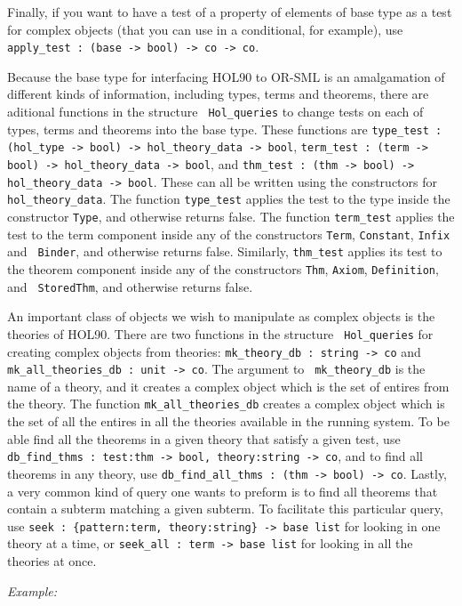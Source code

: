 Finally, if you want to have a test of a property of elements of
base type as a test for complex objects (that you can use in a
conditional, for example), use {\tt apply\_test : (base -> bool) -> co
-> co}.

Because the base type for interfacing HOL90 to OR-SML is an
amalgamation of different kinds of information, including types, terms
and theorems, there are aditional functions in the structure {\tt
Hol\_queries} to change tests on each of types, terms and theorems into
the base type.  These functions are
{\tt type\_test : (hol\_type -> bool) -> hol\_theory\_data -> bool},
{\tt term\_test : (term -> bool) -> hol\_theory\_data -> bool}, and
{\tt thm\_test : (thm -> bool) -> hol\_theory\_data -> bool}.  These
can all be written using the constructors for {\tt hol\_theory\_data}.
The function {\tt type\_test} applies the test to the type inside the
constructor {\tt Type}, and otherwise returns false.  The function
{\tt term\_test} applies the test to the term component inside any of
the constructors {\tt Term}, {\tt Constant}, {\tt Infix} and {\tt
Binder}, and otherwise returns false.  Similarly, {\tt thm\_test}
applies its test to the theorem component inside any of the
constructors {\tt Thm}, {\tt Axiom}, {\tt Definition}, and {\tt
StoredThm}, and otherwise returns false.

An important class of objects we wish to manipulate as complex objects is
the theories of HOL90.  There are two functions in the structure {\tt
Hol\_queries} for creating complex objects from theories:
{\tt mk\_theory\_db : string -> co} and
{\tt mk\_all\_theories\_db : unit -> co}.  The argument to {\tt
mk\_theory\_db} is the name of a theory, and it creates a complex
object which is the set of entires from the theory.  The
function {\tt mk\_all\_theories\_db} creates a complex object
which is the set of all the entires in all the theories available in
the running system.  To be able find all the theorems in a given theory
that satisfy a given test, use {\tt db\_find\_thms : {test:thm ->
bool, theory:string} -> co}, and to find all theorems in any theory,
use {\tt db\_find\_all\_thms : (thm -> bool) -> co}.  Lastly, a very
common kind of query one wants to preform is to find all theorems that
contain a subterm matching a given subterm.  To facilitate this
particular query, use {\tt seek : \{pattern:term, theory:string\} ->
base list} for looking in one theory at a time, or {\tt seek\_all :
term -> base list} for looking in all the theories at once.


{\em Example:}

